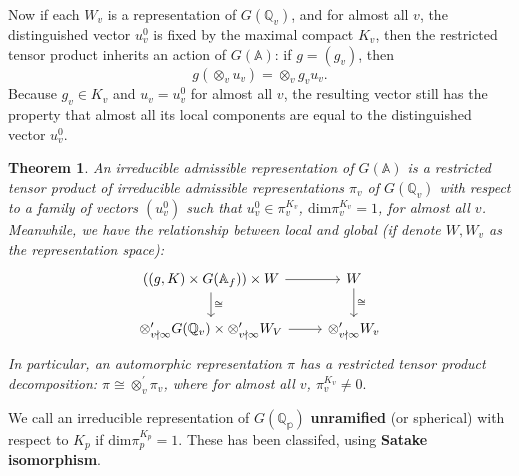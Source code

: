 \documentclass[11pt,english]{smfart}
\newtheorem{theorem}{Theorem}
\theoremstyle{definition}
\theoremstyle{remark}
\begin{document}
Now if each $ W_{v} $ is a representation of $ G\left(\mathbb{Q}_{v}\right) $, and for almost all $ v $,
the distinguished vector $ u_{v}^{0} $ is fixed by the maximal compact $ K_{v} $,
then the restricted tensor product inherits an action of $ G(\mathbb{A})$: if $ g=\left(g_{v}\right) $, then
\[g\left(\otimes_v u_{v}\right)=\otimes_{v} g_{v} u_{v} .\]
Because $ g_{v} \in K_{v} $ and $ u_{v}=u_{v}^{0} $ for almost all $ v $, the resulting vector still has the property that almost all its local components are equal to the distinguished vector $ u_{v}^{0}$.
\begin{theorem}
An irreducible admissible representation of $ G(\mathbb{A}) $ is a restricted tensor product of irreducible admissible representations $ \pi_{v} $ of $ G\left(\mathbb{Q}_{v}\right) $ with respect to a family of vectors $ \left(u_{v}^{0}\right) $ such that $ u_{v}^{0} \in \pi_{v}^{K_{v}}$, $\mathrm{dim} \pi_v^{K_v}=1$, for almost all $ v $.
Meanwhile, we have the relationship between local and global (if denote $W,W_v$ as the representation space):
\[\begin{tikzcd}
	{((\mathfrak{g},K)\times G(\mathbb{A}_f))\times W} & W \\
	{\otimes_{v \nmid \infty}'G(\mathbb{Q}_v)\times\otimes_{v \nmid \infty}'W_V} & {\otimes_{v \nmid \infty}'W_v}
	\arrow[from=1-1, to=1-2]
	\arrow["\cong", from=1-1, to=2-1]
	\arrow[from=2-1, to=2-2]
	\arrow["\cong", from=1-2, to=2-2]
\end{tikzcd}\]
In particular, an automorphic representation $ \pi $ has a restricted tensor product decomposition: $ \pi \cong \otimes_{v}^{\prime} \pi_{v} $, where for almost all $ v$, $\pi_{v}^{K_{v}} \neq 0 .$
\end{theorem}
We call an irreducible representation of $G(\mathbb{Q_p})$ \textbf{unramified} (or spherical) with respect to $K_p$ if $\mathrm{dim} \pi_p^{K_p}=1$. These has been classifed, using \textbf{Satake isomorphism}.
\end{document}
